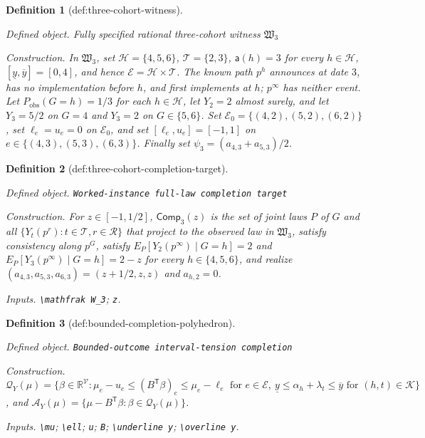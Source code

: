 \documentclass{article}
\newtheorem{definition}{Definition}
\begin{document}
\begin{definition}[def:three-cohort-witness]\label{def:three-cohort-witness}
\par\smallskip\noindent\emph{Defined object.} Fully specified rational three-cohort witness \(\mathfrak W_3\)
\par\smallskip\noindent\emph{Construction.} In \(\mathfrak W_3\), set \(\mathcal H=\{4,5,6\}\), \(\mathcal T=\{2,3\}\), \(\mathsf a(h)=3\) for every \(h\in\mathcal H\), \([\underline y,\overline y]=[0,4]\), and hence \(\mathcal E=\mathcal H\times\mathcal T\). The known path \(p^h\) announces at date \(3\), has no implementation before \(h\), and first implements at \(h\); \(p^\infty\) has neither event. Let \(P_{\mathrm{obs}}(G=h)=1/3\) for each \(h\in\mathcal H\), let \(Y_2=2\) almost surely, and let \(Y_3=5/2\) on \(G=4\) and \(Y_3=2\) on \(G\in\{5,6\}\). Set \(\mathcal E_0=\{(4,2),(5,2),(6,2)\}\), set \(\ell_e=u_e=0\) on \(\mathcal E_0\), and set \([\ell_e,u_e]=[-1,1]\) on \(e\in\{(4,3),(5,3),(6,3)\}\). Finally set \(\psi_3=(a_{4,3}+a_{5,3})/2\).
\end{definition}

\begin{definition}[def:three-cohort-completion-target]\label{def:three-cohort-completion-target}
\par\smallskip\noindent\emph{Defined object.} \texttt{Worked-\allowbreak{}instance full-\allowbreak{}law completion target}
\par\smallskip\noindent\emph{Construction.} For \(z\in[-1,1/2]\), \(\mathsf{Comp}_3(z)\) is the set of joint laws \(P\) of \(G\) and all \(\{Y_t(p^r):t\in\mathcal T,r\in\mathcal R\}\) that project to the observed law in \(\mathfrak W_3\), satisfy consistency along \(p^G\), satisfy \(E_P[Y_2(p^\infty)\mid G=h]=2\) and \(E_P[Y_3(p^\infty)\mid G=h]=2-z\) for every \(h\in\{4,5,6\}\), and realize \((a_{4,3},a_{5,3},a_{6,3})=(z+1/2,z,z)\) and \(a_{h,2}=0\).
\par\smallskip\noindent\emph{Inputs.} \texttt{\textbackslash{}\allowbreak{}mathfrak W\_\allowbreak{}3}; \texttt{z}.
\end{definition}

\begin{definition}[def:bounded-completion-polyhedron]\label{def:bounded-completion-polyhedron}
\par\smallskip\noindent\emph{Defined object.} \texttt{Bounded-\allowbreak{}outcome interval-\allowbreak{}tension completion}
\par\smallskip\noindent\emph{Construction.} \(\mathcal Q_Y(\mu)=\{\beta\in\mathbb R^{\mathcal V}:\mu_e-u_e\le(B^{\mathsf T}\beta)_e\le\mu_e-\ell_e\text{ for }e\in\mathcal E,\ \underline y\le\alpha_h+\lambda_t\le\overline y\text{ for }(h,t)\in\mathcal K\}\), and \(\mathcal A_Y(\mu)=\{\mu-B^{\mathsf T}\beta:\beta\in\mathcal Q_Y(\mu)\}\).
\par\smallskip\noindent\emph{Inputs.} \texttt{\textbackslash{}\allowbreak{}mu}; \texttt{\textbackslash{}\allowbreak{}ell}; \texttt{u}; \texttt{B}; \texttt{\textbackslash{}\allowbreak{}underline y}; \texttt{\textbackslash{}\allowbreak{}overline y}.
\end{definition}
\end{document}
